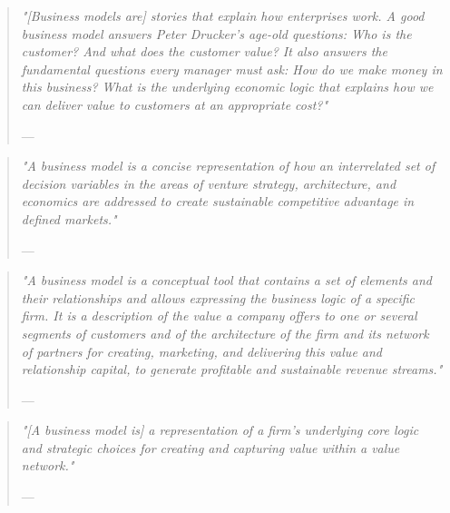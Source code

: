 \begin{quote}{\slshape 
"[Business models are] stories that explain how enterprises work. A good business model answers Peter Drucker's age-old questions: Who is the customer? And what does the customer value? It also answers the fundamental questions every manager must ask: How do we make money in this business? What is the underlying economic logic that explains how we can deliver value to customers at an appropriate cost?"}
\vspace*{-7pt}
\begin{flushright}
	--- \citet[p. 2]{Magretta2002}
\end{flushright}
\end{quote}

\begin{quote}{\slshape 
"A business model is a concise representation of how an interrelated set of decision variables in the areas of venture strategy, architecture, and economics are addressed to create sustainable competitive advantage in defined markets."}
\vspace*{-7pt}
\begin{flushright}
	--- \citet[p. 727]{Morris2005}
\end{flushright}
\end{quote}

\begin{quote}{\slshape 
"A business model is a conceptual tool that contains a set of elements and their relationships and allows expressing the business logic of a specific firm. It is a description of the value a company offers to one or several segments of customers and of the architecture of the firm and its network of partners for creating, marketing, and delivering this value and relationship capital, to generate profitable and sustainable revenue streams."}
\vspace*{-7pt}
\begin{flushright}
	--- \citet[p. 10]{Osterwalder2005}
\end{flushright}
\end{quote}
	
\begin{quote}{\slshape 
"[A business model is] a representation of a firm's underlying core logic and strategic choices for creating and capturing value within a value network."}
\vspace*{-7pt}
\begin{flushright}
	--- \citet[p. 202]{Shafer2005}
\end{flushright}
\end{quote}

